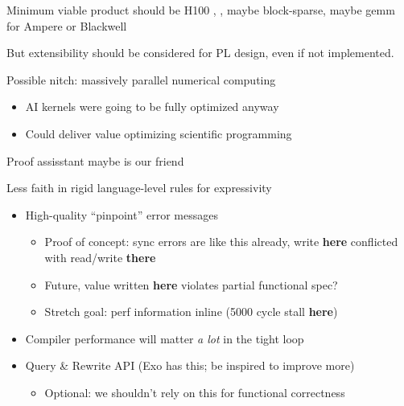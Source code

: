 \newpage
{}

{\LARGE
Minimum viable product should be H100 , , maybe block-sparse, maybe gemm for Ampere or Blackwell

But extensibility should be considered for PL design, even if not implemented.

\vfill

Possible nitch: massively parallel numerical computing
\begin{itemize}
  \item AI kernels were going to be fully optimized anyway
  \item Could deliver value optimizing scientific programming
\end{itemize}

\vfill

Proof assisstant maybe is our friend

Less faith in rigid language-level rules for expressivity

\vfill


}


\newpage
{}

\newpage
{}

{\LARGE




}

\newpage
{}

{\LARGE


\begin{itemize}
  \item High-quality ``pinpoint'' error messages
  \begin{itemize}
    \item Proof of concept: sync errors are like this already, write \textbf{here} conflicted with read/write \textbf{there}
    \item Future, value written \textbf{here} violates partial functional spec?
    \item Stretch goal: perf information inline (5000 cycle stall \textbf{here})
  \end{itemize}
  \item Compiler performance will matter \emph{a lot} in the tight loop
  \item Query \& Rewrite API (Exo has this; be inspired to improve more)
  \begin{itemize}
    \item Optional: we shouldn't rely on this for functional correctness
  \end{itemize}
\end{itemize}



}

